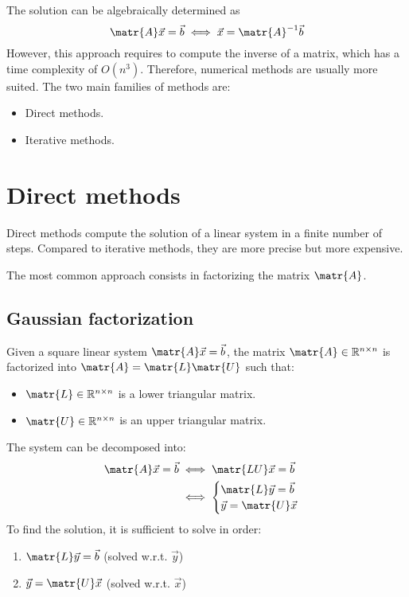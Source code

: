 The solution can be algebraically determined as 
\[ \matr{A}\vec{x} = \vec{b} \iff \vec{x} = \matr{A}^{-1}\vec{b} \]
However, this approach requires to compute the inverse of a matrix, which has a time complexity of $O(n^3)$.
Therefore, numerical methods are usually more suited.
The two main families of methods are:
\begin{itemize}
    \item Direct methods.
    \item Iterative methods.
\end{itemize}



\section{Direct methods}
Direct methods compute the solution of a linear system in a finite number of steps.
Compared to iterative methods, they are more precise but more expensive.

The most common approach consists in factorizing the matrix $\matr{A}$.

\subsection{Gaussian factorization}
Given a square linear system $\matr{A}\vec{x} = \vec{b}$, 
the matrix $\matr{A} \in \mathbb{R}^{n \times n}$ is factorized into $\matr{A} = \matr{L}\matr{U}$ such that:
\begin{itemize}
    \item $\matr{L} \in \mathbb{R}^{n \times n}$ is a lower triangular matrix.
    \item $\matr{U} \in \mathbb{R}^{n \times n}$ is an upper triangular matrix.
\end{itemize}
%
The system can be decomposed into:
\[
    \begin{split}
        \matr{A}\vec{x} = \vec{b} & \iff \matr{LU}\vec{x} = \vec{b} \\
            & \iff 
            \begin{cases}
                \matr{L}\vec{y} = \vec{b} \\
                \vec{y} = \matr{U}\vec{x} 
            \end{cases}
    \end{split}
\]
To find the solution, it is sufficient to solve in order:
\begin{enumerate}
    \item $\matr{L}\vec{y} = \vec{b}$ (solved w.r.t. $\vec{y}$)
    \item $\vec{y} = \matr{U}\vec{x}$ (solved w.r.t. $\vec{x}$)
\end{enumerate}

